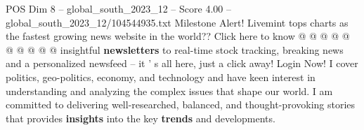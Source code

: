 \begin{textsample}{POS Dim 8 – global\_south\_2023\_12 – Score 4.00 – global\_south\_2023\_12/104544935.txt}
Milestone Alert!
Livemint tops charts as the fastest growing news website in the world??
Click here to know @ @ @ @ @ @ @ @ @ @ insightful \textbf{newsletters} to real-time stock tracking, breaking news and a personalized newsfeed -- it ' s all here, just a click away!
Login Now!
I cover politics, geo-politics, economy, and technology and have keen interest in understanding and analyzing the complex issues that shape our world.
I am committed to delivering well-researched, balanced, and thought-provoking stories that provides \textbf{insights} into the key \textbf{trends} and developments.

\end{textsample}
